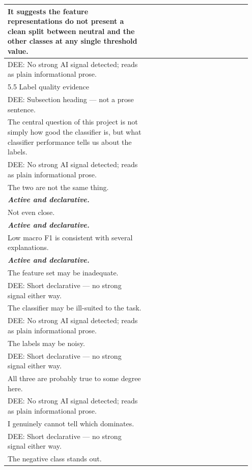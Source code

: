 \documentclass[11pt]{article}
\begin{document}
\begin{longtable}{|p{0.55\linewidth}|p{0.40\linewidth}|}
\hline
It suggests the feature representations do not present a clean split between neutral and the other classes at any single threshold value. & \\[2pt]
\hline
DEE: No strong AI signal detected; reads as plain informational prose. & \\
\hline
5.5 Label quality evidence & \\[2pt]
\hline
DEE: Subsection heading --- not a prose sentence. & \\
\hline
The central question of this project is not simply how good the classifier is, but what classifier performance tells us about the labels. & \\[2pt]
\hline
DEE: No strong AI signal detected; reads as plain informational prose. & \\
\hline
The two are not the same thing. & \\[2pt]
\hline
\textbf{\textit{Active and declarative.}}\vspace{2em} & \\
\hline
Not even close. & \\[2pt]
\hline
\textbf{\textit{Active and declarative.}}\vspace{2em} & \\
\hline
Low macro F1 is consistent with several explanations. & \\[2pt]
\hline
\textbf{\textit{Active and declarative.}}\vspace{2em} & \\
\hline
The feature set may be inadequate. & \\[2pt]
\hline
DEE: Short declarative --- no strong signal either way. & \\
\hline
The classifier may be ill-suited to the task. & \\[2pt]
\hline
DEE: No strong AI signal detected; reads as plain informational prose. & \\
\hline
The labels may be noisy. & \\[2pt]
\hline
DEE: Short declarative --- no strong signal either way. & \\
\hline
All three are probably true to some degree here. & \\[2pt]
\hline
DEE: No strong AI signal detected; reads as plain informational prose. & \\
\hline
I genuinely cannot tell which dominates. & \\[2pt]
\hline
DEE: Short declarative --- no strong signal either way. & \\
\hline
The negative class stands out. & \\[2pt]

\end{longtable}
\end{document}
